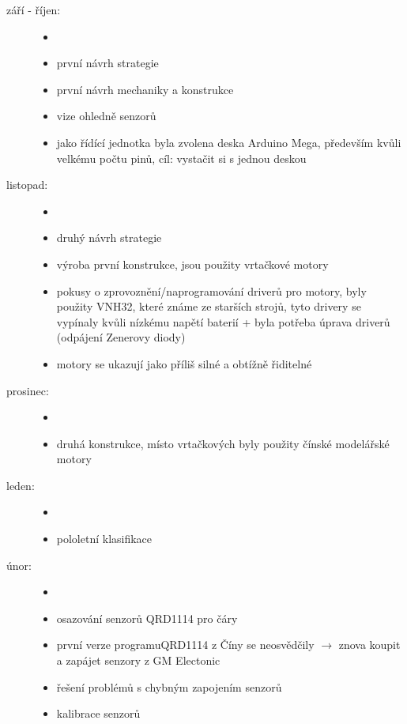 \begin{description}
	\item[září - říjen:] 
	
	\begin{itemize}
	    \item[]
		\item první návrh strategie
		\item první návrh mechaniky a konstrukce
		\item  vize ohledně senzorů
		\item jako řídící jednotka byla zvolena deska Arduino Mega, především kvůli velkému počtu pinů, cíl: vystačit si s jednou deskou  
		
	\end{itemize} 
	
	\item[listopad:] 
	
	\begin{itemize}
		\item[]
		\item druhý návrh strategie
		\item výroba první konstrukce, jsou použity vrtačkové motory
		\item pokusy o zprovoznění/naprogramování driverů pro motory, byly použity VNH32, které známe ze starších strojů, 
		tyto drivery se vypínaly kvůli nízkému napětí baterií + byla potřeba úprava driverů (odpájení Zenerovy diody)  
		\item motory se ukazují jako příliš silné a obtížně řiditelné 
	\end{itemize}
	
	\item[prosinec:]
	\begin{itemize}
		\item[]
		\item druhá konstrukce, místo vrtačkových byly použity čínské modelářské motory
	\end{itemize} 
	
	\item[leden:]
	\begin{itemize}
		\item[]
		\item  pololetní klasifikace
	\end{itemize}  
	
	\item[únor:] 
	\begin{itemize}
		\item[]
		\item osazování senzorů QRD1114 pro čáry
		\item první verze programuQRD1114 z Číny se neosvědčily $\rightarrow$ znova koupit a zapájet senzory z GM Electonic
		\item řešení problémů s chybným zapojením senzorů 
		\item kalibrace senzorů 	
	\end{itemize} 
	

\end{description}
